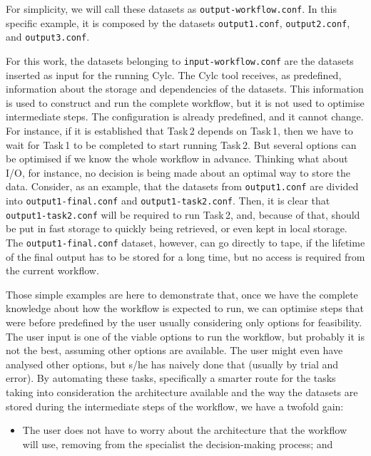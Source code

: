 \documentclass[a4paper]{article}
\begin{document}
{{{{\begin{description}
For simplicity, we will call these datasets as \texttt{output-workflow.conf}. In this specific example, it is composed by the datasets \texttt{output1.conf}, \texttt{output2.conf}, and \texttt{output3.conf}.

\end{description}

For this work, the datasets belonging to \texttt{input-workflow.conf} are the datasets inserted as input for the running Cylc. The Cylc tool receives, as predefined, information about the storage and dependencies of the datasets. This information is used to construct and run the complete workflow, but it is not used to optimise intermediate steps. The configuration is already predefined, and it cannot change. For instance, if it is established that Task\,2 depends on Task\,1, then we have to wait for Task\,1 to be completed to start running Task\,2. But several options can be optimised if we know the whole workflow in advance. Thinking what about I/O, for instance, no decision is being made about an optimal way to store the data. Consider, as an example, that the datasets from \texttt{output1.conf} are divided into \texttt{output1-final.conf} and \texttt{output1-task2.conf}. Then, it is clear that \texttt{output1-task2.conf} will be required to run Task\,2, and, because of that, should be put in fast storage to quickly being retrieved, or even kept in local storage. The \texttt{output1-final.conf} dataset, however, can go directly to tape, if the lifetime of the final output has to be stored for a long time, but no access is required from the current workflow.

Those simple examples are here to demonstrate that, once we have the complete knowledge about how the workflow is expected to run, we can optimise steps that were before predefined by the user usually considering only options for feasibility. The user input is one of the viable options to run the workflow, but probably it is not the best, assuming other options are available. The user might even have analysed other options, but s/he has naively done that (usually by trial and error). By automating these tasks, specifically a smarter route for the tasks taking into consideration the architecture available and the way the datasets are stored during the intermediate steps of the workflow, we have a twofold gain:

\begin{itemize}

\item The user does not have to worry about the architecture that the workflow will use, removing from the specialist the decision-making process; and


\end{itemize}}}}}
\end{document}
